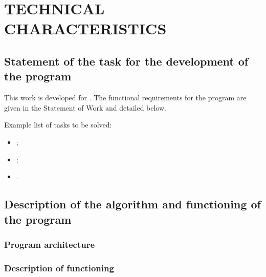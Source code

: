 \documentclass[12pt,a4paper]{extarticle}
\begin{document}
\clearpage

\section{TECHNICAL CHARACTERISTICS}

\subsection{Statement of the task for the development of the program}

This work is developed for . The functional requirements for the program are given in the Statement of Work and detailed below.

\begin{hseExample}
Example list of tasks to be solved:
\begin{itemize}[nosep, leftmargin=1.25cm]
    \item {};
    \item {};
    \item {}.
\end{itemize}
\end{hseExample}

\subsection{Description of the algorithm and functioning of the program}

\subsubsection{Program architecture}


\subsubsection{Description of functioning}
\end{document}
